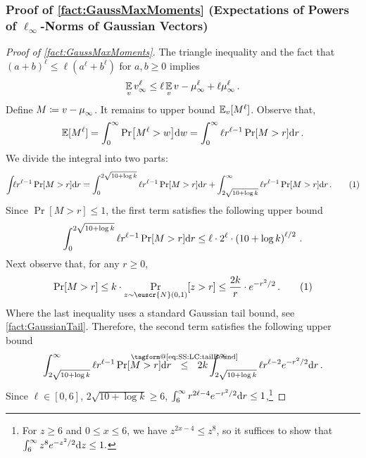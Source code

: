 \documentclass[11pt,letterpaper]{article}
\makeatletter
\theoremstyle{plain}
\theoremstyle{definition}
\theoremstyle{remark}
\newcommand{\yesnum}{\addtocounter{equation}{1}\tag{\theequation}}
\renewcommand{\eqref}[1]{\textup{\eqrefform@{\ref{#1}}}}
\let\eqrefform@\tagform@
\newcommand{\Stackrel}[2]{\stackrel{\mathmakebox[\widthof{\ensuremath{#2}}]{#1}}{#2}}
\newcommand{\inparen}[1]{\ensuremath{\left(#1\right)}}
\let\norm\relax
\newcommand{\norm}[1]{\ensuremath{\left\lVert #1 \right\rVert}}
\newcommand{\E}{\operatornamewithlimits{\mathbb{E}}}
\newcommand{\Ex}{\E}
\newcommand{\customcal}[1]{\euscr{#1}}
\newcommand{\cN}{\customcal{N}}
\renewcommand{\d}{{\rm d}}
\makeatother
\begin{document}
{{    \subsubsection*{Proof of \cref{fact:GaussMaxMoments} (Expectations of Powers of $\ell_\infty$-Norms of Gaussian Vectors)}
    \begin{proof}[Proof of \cref{fact:GaussMaxMoments}]
        The triangle inequality and the fact that $(a+b)^\ell\leq \ell(a^\ell+b^\ell)$ for $a,b\geq 0$ implies
        \[
            \Ex_{v}\norm{v}_\infty^\ell 
            \leq 
            \ell \Ex_{v}\norm{v-\mu}_\infty^\ell 
            + 
            \ell\norm{\mu}_\infty^\ell\,.
        \]
        Define $M\coloneqq \norm{v-\mu}_\infty$.
        It remains to upper bound $ \Ex_{v}[M^\ell]$.
        Observe that,
        \begin{align*}
            \Ex[M^\ell] 
            = \int_0^\infty \Pr[M^\ell > w] \d w 
            = \int_0^\infty \ell r^{\ell-1}\Pr[M > r] \d r\,.
        \end{align*}
        We divide the integral into two parts:
        \[
            \int_{} \ell r^{\ell-1}\Pr[M > r]\d r
            = 
                \int_{0}^{2\sqrt{10+\log{k}}} \ell r^{\ell-1}\Pr[M > r]\d r
                +
                \int_{2\sqrt{10+\log{k}}}^\infty \ell r^{\ell-1}\Pr[M > r]\d r\,.
                \yesnum\label{eq:SS:LC:GaussMaxMoments:twoTermSum}
        \]
        Since $\Pr[M > r]\leq 1$, the first term satisfies the following upper bound 
        \[
            \int_{0}^{2\sqrt{10+\log{k}}} \ell r^{\ell-1}\Pr[M > r]\d r
            \leq \ell \cdot 2^{\ell} \cdot \inparen{10+\log{k}}^{\ell/2}\,.
        \]
        Next observe that, for any $r\geq 0$,
        \[
            \Pr[M > r]
            \leq k\cdot \Pr_{z\sim \cN(0,1)}[z>r] 
            \Stackrel{}{\leq}
                \frac{2k}{r}\cdot e^{-r^2/2}\,.
                \yesnum\label{eq:SS:LC:tailBound}
        \]
        Where the last inequality uses a standard Gaussian tail bound, see \cref{fact:GaussianTail}.
        Therefore, the second term satisfies the following upper bound
        \[
            \int_{2\sqrt{10+\log{k}}}^\infty \ell r^{\ell-1}\Pr[M > r]\d r
            ~~\Stackrel{\eqref{eq:SS:LC:tailBound}}{\leq }~~
            2k \int_{2\sqrt{10+\log{k}}}^\infty \ell r^{\ell-2} e^{-r^2/2}\d r\,.
        \]
        Since $\ell\in [0,6]$, $2\sqrt{10+\log{k}}\geq 6$, $\int_{6}^\infty r^{2\ell-4} e^{-r^2/2}\d r\leq 1$,\footnote{For $z\ge6$ and $0\le x\le6$, we have $z^{2x-4}\le z^8$, so it suffices to show that $\int_{6}^{\infty}z^8e^{-z^2/2}\d z\leq 1.$
}
\end{proof}}}
\end{document}
